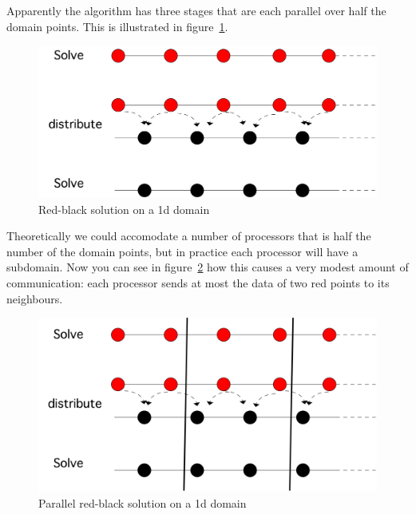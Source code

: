 \begin{displayalgorithm}
\end{displayalgorithm}

Apparently the algorithm has three stages that are each parallel over
half the domain points. This is illustrated in
figure~\ref{fig:1d-rb-solve}.
\begin{figure}[ht]
  \includegraphics[scale=.1]{graphics-public/red-black-1d-solve}
  \caption{Red-black solution on a 1d domain}
  \label{fig:1d-rb-solve}
\end{figure}
Theoretically we could accomodate a number of processors that is half
the number of the domain points, but in practice each processor will
have a subdomain. Now you can see in figure~\ref{fig:1d-rb-solve-par}
how this causes a very modest amount of communication: each processor
sends at most the data of two red points to its neighbours.
\begin{figure}[ht]
  \includegraphics[scale=.1]{graphics-public/red-black-1d-solve-par}
  \caption{Parallel red-black solution on a 1d domain}
  \label{fig:1d-rb-solve-par}
\end{figure}

